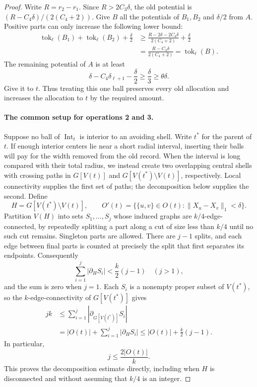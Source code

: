 \documentclass[11pt]{amsart}
\theoremstyle{definition}
\theoremstyle{remark}
\numberwithin{equation}{section}
\begin{document}
\begin{proof}
Write $R=r_2-r_1$.  Since $R>2C_3\delta$, the old potential is
$(R-C_4\delta)/(2(C_4+2))$.  Give $B$ all the potentials of $B_1,B_2$ and
$\delta/2$ from $A$.  Positive parts can only increase the following
lower bound:
\begin{align*}
 \operatorname{tok}_\ell(B_1)+\operatorname{tok}_\ell(B_2)
       +\frac\delta2
 &\geq\frac{R-2\delta-2C_4\delta}{2(C_4+2)}
       +\frac\delta2\\
 &=\frac{R-C_4\delta}{2(C_4+2)}
  =\operatorname{tok}_\ell(B).
\end{align*}
The remaining potential of $A$ is at least
\[
 \delta-C_4\delta_{\ell+1}-\frac\delta2
 \geq\frac\delta3\geq\theta\delta.
\]
Give it to $t$.  Thus treating this one ball preserves every old
allocation and increases the allocation to $t$ by the required amount.

\paragraph{\textbf{The common setup for operations 2 and 3.}}
Suppose no ball of $\operatorname{Int}_t$ is interior to an avoiding
shell.  Write $t^*$ for the parent of $t$.
If enough interior centers lie near a short radial interval, inserting
their balls will pay for the width removed from the old record.
When the interval is long compared with their total radius, we instead
create two overlapping central shells with crossing paths in
$G[V(t)]$ and $G[V(t^*)\setminus V(t)]$, respectively.
Local connectivity supplies the first set of paths; the decomposition
below supplies the second.  Define
\[
 H=G[V(t^*)\setminus V(t)],\qquad
 O'(t)=\{\{u,v\}\in O(t):\|X_u-X_v\|_1<\delta\}.
\]
Partition $V(H)$ into sets $S_1,\ldots,S_j$ whose induced graphs are
$k/4$-edge-connected, by repeatedly splitting a part along a cut of
size less than $k/4$ until no such cut remains.  Singleton parts are
allowed.  There are $j-1$ splits, and each edge between final parts is
counted at precisely the split that first separates its endpoints.
Consequently
\[
 \sum_{i=1}^j|\partial_H S_i|
    <\frac{k}{2}(j-1)\quad(j>1),
\]
and the sum is zero when $j=1$.  Each $S_i$ is a nonempty proper subset
of $V(t^*)$, so the $k$-edge-connectivity of $G[V(t^*)]$ gives
\begin{align*}
 jk
 &\leq\sum_{i=1}^j|\partial_{G[V(t^*)]}S_i|\\
 &=|O(t)|+\sum_{i=1}^j|\partial_H S_i|
 \leq |O(t)|+\frac{k}{2}(j-1).
\end{align*}
In particular,
\begin{equation}
 j\leq\frac{2|O(t)|}{k}.
 \label{ha:component-count}
\end{equation}
This proves the decomposition estimate directly, including when $H$
is disconnected and without assuming that $k/4$ is an integer.


\end{proof}
\end{document}
